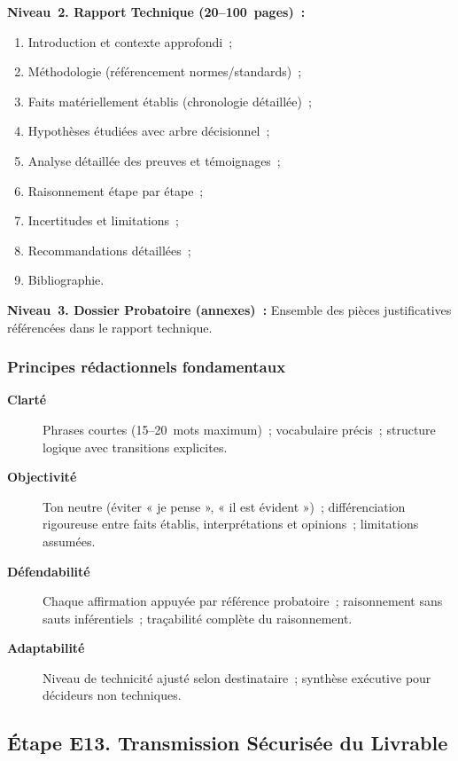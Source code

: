 \textbf{Niveau~2. Rapport Technique (20--100~pages)~:}
\begin{enumerate}
    \item Introduction et contexte approfondi~;
    \item Méthodologie (référencement normes/standards)~;
    \item Faits matériellement établis (chronologie détaillée)~;
    \item Hypothèses étudiées avec arbre décisionnel~;
    \item Analyse détaillée des preuves et témoignages~;
    \item Raisonnement étape par étape~;
    \item Incertitudes et limitations~;
    \item Recommandations détaillées~;
    \item Bibliographie.
\end{enumerate}

\textbf{Niveau~3. Dossier Probatoire (annexes)~:} Ensemble des pièces
justificatives référencées dans le rapport technique.

\subsubsection*{Principes rédactionnels fondamentaux}
\begin{description}
    \item[\textbf{Clarté}] Phrases courtes (15--20~mots maximum)~;
          vocabulaire précis~; structure logique avec transitions explicites.
    \item[\textbf{Objectivité}] Ton neutre (éviter « je pense »,
          « il est évident »)~; différenciation rigoureuse entre faits établis,
          interprétations et opinions~; limitations assumées.
    \item[\textbf{Défendabilité}] Chaque affirmation appuyée par référence
          probatoire~; raisonnement sans sauts inférentiels~;
          traçabilité complète du raisonnement.
    \item[\textbf{Adaptabilité}] Niveau de technicité ajusté selon
          destinataire~; synthèse exécutive pour décideurs non techniques.
\end{description}

\subsection{Étape E13. Transmission Sécurisée du Livrable}

